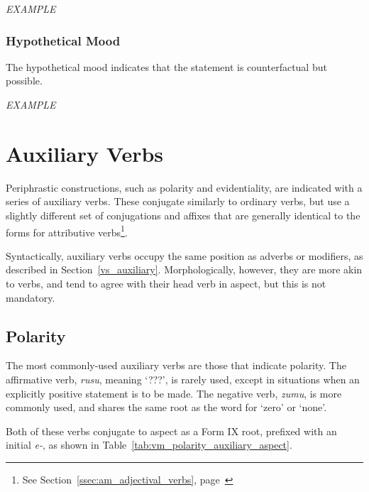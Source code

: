 \documentclass[grammar]{subfiles}
\begin{document}
  \begin{exe}
    \ex \emph{EXAMPLE}
  \end{exe}

  \subsubsection{Hypothetical Mood}
  \label{sssec:vm_hypothetical}

  The hypothetical mood indicates that the statement is counterfactual but possible.

  \begin{exe}
    \ex \emph{EXAMPLE}
  \end{exe}


  \section{Auxiliary Verbs}
  \label{sec:vm_auxiliary}

  Periphrastic constructions, such as polarity and evidentiality, are indicated with a series of auxiliary verbs. These conjugate similarly to ordinary verbs, but use a slightly different set of conjugations and affixes that are generally identical to the forms for attributive verbs\footnote{See Section~\ref{ssec:am_adjectival_verbs}, page~\pageref{ssec:am_adjectival_verbs}}. 

  Syntactically, auxiliary verbs occupy the same position as adverbs or modifiers, as described in Section~\ref{vs_auxiliary}. Morphologically, however, they are more akin to verbs, and tend to agree with their head verb in aspect, but this is not mandatory.

  \subsection{Polarity}
  \label{ssec:vm_polarity}

  The most commonly-used auxiliary verbs are those that indicate polarity. The affirmative verb, \textit{rusu}, meaning ‘???’, is rarely used, except in situations when an explicitly positive statement is to be made. The negative verb, \textit{zumu}, is more commonly used, and shares the same root as the word for ‘zero’ or ‘none’.

  Both of these verbs conjugate to aspect as a Form IX root, prefixed with an initial \textit{e-}, as shown in Table~\ref{tab:vm_polarity_auxiliary_aspect}.
\end{document}
